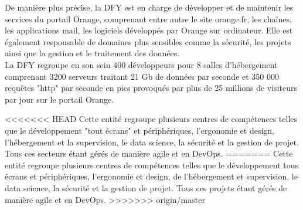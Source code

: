 De manière plus précise, la DFY est en charge de développer et de maintenir les services du portail Orange, comprenant entre autre le site orange.fr, les chaînes, les applications mail,  les logiciels développés par Orange sur ordinateur.
Elle est également responsable de domaines plus sensibles comme la sécurité, les projets ainsi que la gestion et le traitement des données.\\

La DFY regroupe en son sein 400 développeurs pour 8 salles d’hébergement comprenant 3200 serveurs traitant 21 Gb de données par seconde et 350 000 requêtes "http" par seconde en pics provoqués par plus de 25 millions de visiteurs par jour sur le portail Orange.

<<<<<<< HEAD
Cette entité regroupe plusieurs centres de compétences telles que le développement "tout écrans" et périphériques, l'ergonomie et design, l'hébergement et la supervision, le data science, la sécurité et la gestion de projet. Tous ces secteurs étant gérés de manière agile et en DevOps. 
=======
Cette entité regroupe plusieurs centres de compétences telles que le développement tous écrans et périphériques, l'ergonomie et design, de l'hébergement et supervision, le data science, la sécurité et la gestion de projet. Tous ces projets étant gérés de manière agile et en DevOps. 
>>>>>>> origin/master

